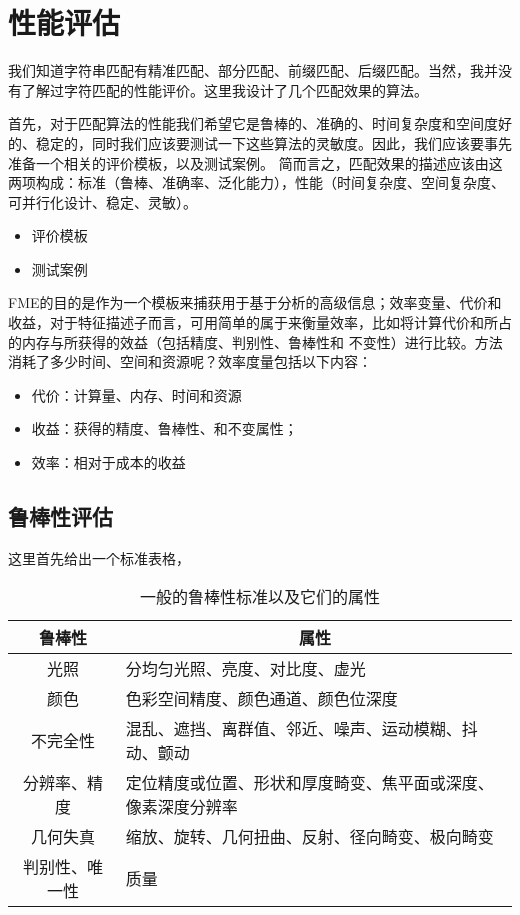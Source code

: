 \section{性能评估}

我们知道字符串匹配有精准匹配、部分匹配、前缀匹配、后缀匹配。当然，我并没有了解过字符匹配的性能评价。这里我设计了几个匹配效果的算法。

首先，对于匹配算法的性能我们希望它是鲁棒的、准确的、时间复杂度和空间度好的、稳定的，同时我们应该要测试一下这些算法的灵敏度。因此，我们应该要事先准备一个相关的评价模板，以及测试案例。
简而言之，匹配效果的描述应该由这两项构成：标准（鲁棒、准确率、泛化能力），性能（时间复杂度、空间复杂度、可并行化设计、稳定、灵敏）。
\begin{itemize}
    \item 评价模板
    \item 测试案例
\end{itemize}

FME的目的是作为一个模板来捕获用于基于分析的高级信息；效率变量、代价和收益，对于特征描述子而言，可用简单的属于来衡量效率，比如将计算代价和所占的内存与所获得的效益（包括精度、判别性、鲁棒性和
不变性）进行比较。方法消耗了多少时间、空间和资源呢？效率度量包括以下内容：
\begin{itemize}
    \item 代价：计算量、内存、时间和资源
    \item 收益：获得的精度、鲁棒性、和不变属性；
    \item 效率：相对于成本的收益
\end{itemize}

\subsection{鲁棒性评估}

这里首先给出一个标准表格，
\begin{table}[!htbp]
    \caption{一般的鲁棒性标准以及它们的属性}
    \label{tab:Robust}
    \centering
    \footnotesize%
    \begin{tabular}{|c|l|}
        \hline
        \textbf{鲁棒性} & \multicolumn{1}{c|}{\textbf{属性}} \\ \hline
        光照           & 分均匀光照、亮度、对比度、虚光                  \\ \hline
        颜色           & 色彩空间精度、颜色通道、颜色位深度                \\ \hline
        不完全性         & 混乱、遮挡、离群值、邻近、噪声、运动模糊、抖动、颤动       \\ \hline
        分辨率、精度       & 定位精度或位置、形状和厚度畸变、焦平面或深度、像素深度分辨率   \\ \hline
        几何失真         & 缩放、旋转、几何扭曲、反射、径向畸变、极向畸变          \\ \hline
        判别性、唯一性      & 质量                               \\ \hline
    \end{tabular}
\end{table}

